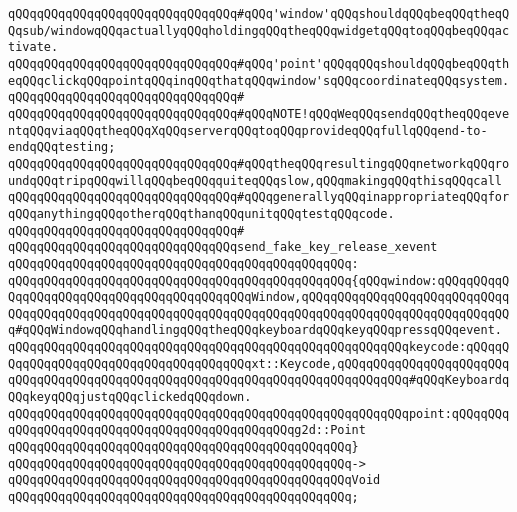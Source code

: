 \verb|qQQqqQQqqQQqqQQqqQQqqQQqqQQqqQQq#qQQq'window'qQQqshouldqQQqbeqQQqtheqQQqsub/windowqQQqactuallyqQQqholdingqQQqtheqQQqwidgetqQQqtoqQQqbeqQQqactivate.|\newline
\verb|qQQqqQQqqQQqqQQqqQQqqQQqqQQqqQQq#qQQq'point'qQQqqQQqshouldqQQqbeqQQqtheqQQqclickqQQqpointqQQqinqQQqthatqQQqwindow'sqQQqcoordinateqQQqsystem.|\newline
\verb|qQQqqQQqqQQqqQQqqQQqqQQqqQQqqQQq#|\newline
\verb|qQQqqQQqqQQqqQQqqQQqqQQqqQQqqQQq#qQQqNOTE!qQQqWeqQQqsendqQQqtheqQQqeventqQQqviaqQQqtheqQQqXqQQqserverqQQqtoqQQqprovideqQQqfullqQQqend-to-endqQQqtesting;|\newline
\verb|qQQqqQQqqQQqqQQqqQQqqQQqqQQqqQQq#qQQqtheqQQqresultingqQQqnetworkqQQqroundqQQqtripqQQqwillqQQqbeqQQqquiteqQQqslow,qQQqmakingqQQqthisqQQqcall|\newline
\verb|qQQqqQQqqQQqqQQqqQQqqQQqqQQqqQQq#qQQqgenerallyqQQqinappropriateqQQqforqQQqanythingqQQqotherqQQqthanqQQqunitqQQqtestqQQqcode.|\newline
\verb|qQQqqQQqqQQqqQQqqQQqqQQqqQQqqQQq#|\newline
\verb|qQQqqQQqqQQqqQQqqQQqqQQqqQQqqQQqsend_fake_key_release_xevent|\newline
\verb|qQQqqQQqqQQqqQQqqQQqqQQqqQQqqQQqqQQqqQQqqQQqqQQq:|\newline
\verb|qQQqqQQqqQQqqQQqqQQqqQQqqQQqqQQqqQQqqQQqqQQqqQQq{qQQqwindow:qQQqqQQqqQQqqQQqqQQqqQQqqQQqqQQqqQQqqQQqqQQqWindow,qQQqqQQqqQQqqQQqqQQqqQQqqQQqqQQqqQQqqQQqqQQqqQQqqQQqqQQqqQQqqQQqqQQqqQQqqQQqqQQqqQQqqQQqqQQqqQQqqQQq#qQQqWindowqQQqhandlingqQQqtheqQQqkeyboardqQQqkeyqQQqpressqQQqevent.|\newline
\verb|qQQqqQQqqQQqqQQqqQQqqQQqqQQqqQQqqQQqqQQqqQQqqQQqqQQqqQQqkeycode:qQQqqQQqqQQqqQQqqQQqqQQqqQQqqQQqqQQqqQQqxt::Keycode,qQQqqQQqqQQqqQQqqQQqqQQqqQQqqQQqqQQqqQQqqQQqqQQqqQQqqQQqqQQqqQQqqQQqqQQqqQQqqQQq#qQQqKeyboardqQQqkeyqQQqjustqQQqclickedqQQqdown.|\newline
\verb|qQQqqQQqqQQqqQQqqQQqqQQqqQQqqQQqqQQqqQQqqQQqqQQqqQQqqQQqpoint:qQQqqQQqqQQqqQQqqQQqqQQqqQQqqQQqqQQqqQQqqQQqqQQqg2d::Point|\newline
\verb|qQQqqQQqqQQqqQQqqQQqqQQqqQQqqQQqqQQqqQQqqQQqqQQq}|\newline
\verb|qQQqqQQqqQQqqQQqqQQqqQQqqQQqqQQqqQQqqQQqqQQqqQQq->|\newline
\verb|qQQqqQQqqQQqqQQqqQQqqQQqqQQqqQQqqQQqqQQqqQQqqQQqVoid|\newline
\verb|qQQqqQQqqQQqqQQqqQQqqQQqqQQqqQQqqQQqqQQqqQQqqQQq;|\newline
